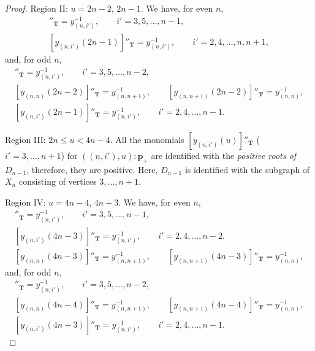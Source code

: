 \begin{proof}
Region II: $u=2n-2$, $2n-1$.
We have, for even $n$,
\begin{gather*}
[y_{(n,i')}(2n-2)]''_{\mathbf{T}} =y_{(n,i')}^{-1},\qquad  i'=3,5,\dots,n-1 ,\nonumber\\
[y_{(n,i')}(2n-1)]''_{\mathbf{T}} =y_{(n,i')}^{-1},\qquad  i'=2,4,\dots,n,n+1 ,%
\end{gather*}
and, for odd $n$,
\begin{gather*}
[y_{(n,i')}(2n-2)]''_{\mathbf{T}} =y_{(n,i')}^{-1}, \qquad  i'=3,5,\dots,n-2 ,\nonumber\\
[y_{(n,n)}(2n-2)]''_{\mathbf{T}} =y_{(n,n+1)}^{-1},
\qquad [y_{(n,n+1)}(2n-2)]''_{\mathbf{T}}=y_{(n,n)}^{-1},\nonumber\\
[y_{(n,i')}(2n-1)]''_{\mathbf{T}} =y_{(n,i')}^{-1},\qquad i'=2,4,\dots,n-1.%
\end{gather*}

Region III: $2n \leq u < 4n-4$.
All the  monomials
$[y_{(n,i')} (u)]''_{\mathbf{T}}$ ($i'=3,\dots,n+1$)
 for $((n,i'),u):\mathbf{p}_+$
are  identif\/ied with
the {\em positive roots of $D_{n-1}$},
therefore, they are positive.
Here, $D_{n-1}$ is identif\/ied with the subgraph of $X_n$
consisting of vertices $3, \dots, n+1$.

Region IV: $u=4n-4$, $4n-3$. We have, for even $n$,
\begin{gather}
[y_{(n,i')}(4n-4)]''_{\mathbf{T}} =y_{(n,i')}^{-1}, \qquad i'=3,5,\dots,n-1,\nonumber\\
[y_{(n,i')}(4n-3)]''_{\mathbf{T}} =y_{(n,i')}^{-1}, \qquad i'=2,4,\dots,n-2,\nonumber\\
[y_{(n,n)}(4n-3)]''_{\mathbf{T}} =y_{(n,n+1)}^{-1},
\qquad [y_{(n,n+1)}(4n-3)]''_{\mathbf{T}}=y_{(n,n)}^{-1},\label{eq:yt3}
\end{gather}
and, for odd $n$,
\begin{gather}
[y_{(n,i')}(4n-4)]''_{\mathbf{T}} =y_{(n,i')}^{-1}, \qquad  i'=3,5,\dots,n-2 ,\nonumber\\
[y_{(n,n)}(4n-4)]''_{\mathbf{T}} =y_{(n,n+1)}^{-1},
\qquad [y_{(n,n+1)}(4n-4)]''_{\mathbf{T}}=y_{(n,n)}^{-1},\nonumber\\
[y_{(n,i')}(4n-3)]''_{\mathbf{T}} =y_{(n,i')}^{-1},\qquad i'=2,4,\dots,n-1.\label{eq:yt6}
\end{gather}


\end{proof}
